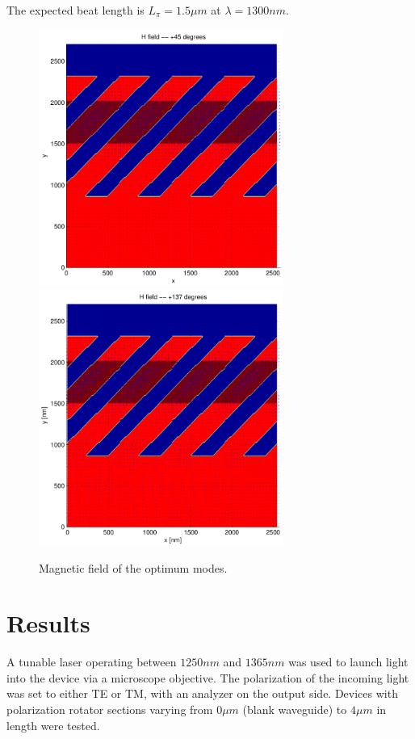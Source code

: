 The expected beat length is $L_\pi = 1.5 \mu m$ at $\lambda = 1300
nm$.

\begin{figure}[htbp]
  \begin{center}
    \includegraphics[width=8cm]{pics/polrot_optimum_1}
    \includegraphics[width=8cm]{pics/polrot_optimum_2}
  \end{center}
  \caption{Magnetic field of the optimum modes.}
  \label{fig:polrot_optimum}
\end{figure}

\section{Results}

A tunable laser operating between $1250 nm$ and $1365 nm$ was used to
launch light into the device via a microscope objective. The
polarization of the incoming light was set to either TE or TM, with an
analyzer on the output side. Devices with polarization rotator
sections varying from $0 \mu m$ (blank waveguide) to $4 \mu m$ in
length were tested.

